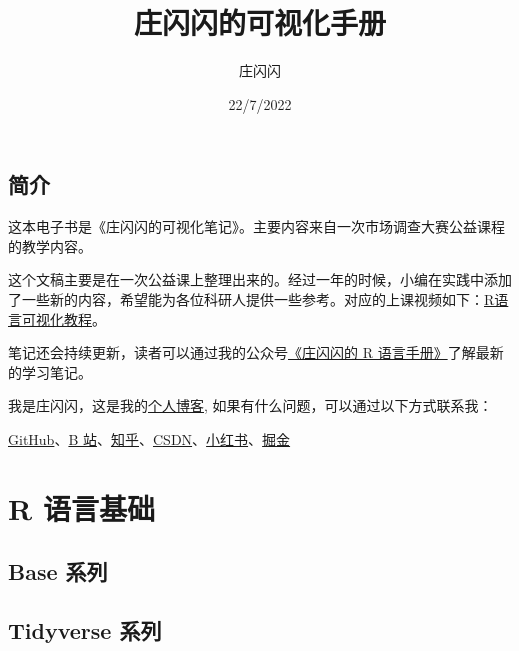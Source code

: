 \documentclass[
]{book}
\title{庄闪闪的可视化手册}
\author{庄闪闪}
\date{22/7/2022}
\begin{document}
\maketitle

{
\setcounter{tocdepth}{1}
\tableofcontents
}
\hypertarget{ux7b80ux4ecb}{%
\chapter*{简介}\label{ux7b80ux4ecb}}

这本电子书是《庄闪闪的可视化笔记》。主要内容来自一次市场调查大赛公益课程的教学内容。

这个文稿主要是在一次公益课上整理出来的。经过一年的时候，小编在实践中添加了一些新的内容，希望能为各位科研人提供一些参考。对应的上课视频如下：\href{https://www.bilibili.com/video/BV1MA411p7VR?spm_id_from=333.999.0.0}{R语言可视化教程}。

笔记还会持续更新，读者可以通过我的公众号\href{https://zll-blog.netlify.app/images/wechat.png}{《庄闪闪的 R 语言手册》}了解最新的学习笔记。

我是庄闪闪，这是我的\href{https://zll-blog.netlify.app/}{个人博客},
如果有什么问题，可以通过以下方式联系我：

\href{https://github.com/liangliangzhuang}{GitHub}、\href{https://space.bilibili.com/226576305}{B 站}、\href{https://www.zhihu.com/people/zhuangshanshan}{知乎}、\href{https://blog.csdn.net/qq_37379316?spm=1011.2124.3001.5343}{CSDN}、\href{https://www.xiaohongshu.com/user/profile/597fbfc15e87e755ab15dc26?xhsshare=WeixinSession\&appuid=597fbfc15e87e755ab15dc26\&apptime=1627016124}{小红书}、\href{https://juejin.cn/user/1689330843128008}{掘金}

\hypertarget{part-r-ux8bedux8a00ux57faux7840}{%
\part{R 语言基础}\label{part-r-ux8bedux8a00ux57faux7840}}

\hypertarget{base-tutorial}{%
\chapter{Base 系列}\label{base-tutorial}}

\hypertarget{tidyverse-tutorial}{%
\chapter{Tidyverse 系列}\label{tidyverse-tutorial}}
\end{document}
